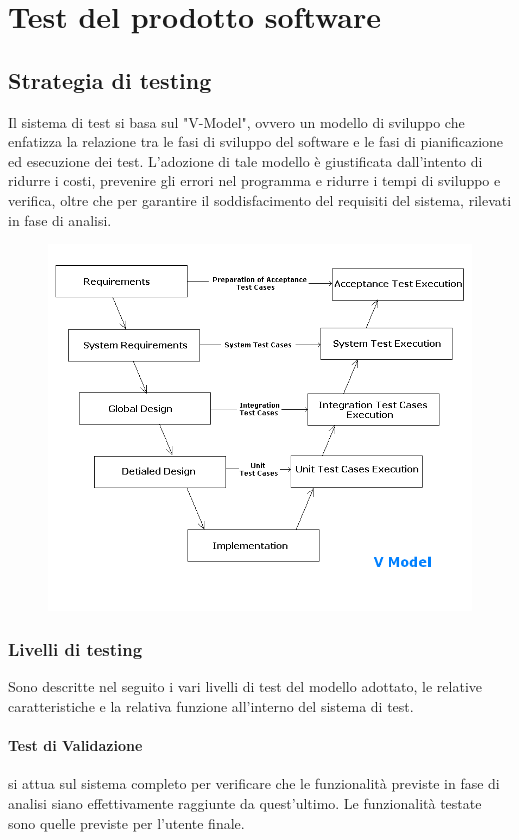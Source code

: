 \documentclass[12pt,a4paper]{article}
\begin{document}
\section{Test del prodotto software}
\subsection{Strategia di testing}
Il sistema di test si basa sul "V-Model", ovvero un modello di sviluppo che enfatizza la relazione tra le fasi di sviluppo del software e le fasi di pianificazione ed esecuzione dei test.
L'adozione di tale modello è giustificata dall'intento di ridurre i costi, prevenire gli errori nel programma e ridurre i tempi di sviluppo e verifica, oltre che per garantire il soddisfacimento del requisiti del sistema, rilevati in fase di analisi.
\begin{figure}[h]
\centering
\includegraphics[width=0.9\linewidth]{../img/v-model}
\caption[V Model]{}
\label{fig:v-model}
\end{figure}

\subsubsection{Livelli di testing}
Sono descritte nel seguito i vari livelli di test del modello adottato, le relative caratteristiche e la relativa funzione all'interno del sistema di test. 
	\paragraph{Test di Validazione} si attua sul sistema completo per verificare che le funzionalità previste in fase di analisi siano effettivamente raggiunte da quest'ultimo. Le funzionalità testate sono quelle previste per l'utente finale.
\end{document}
